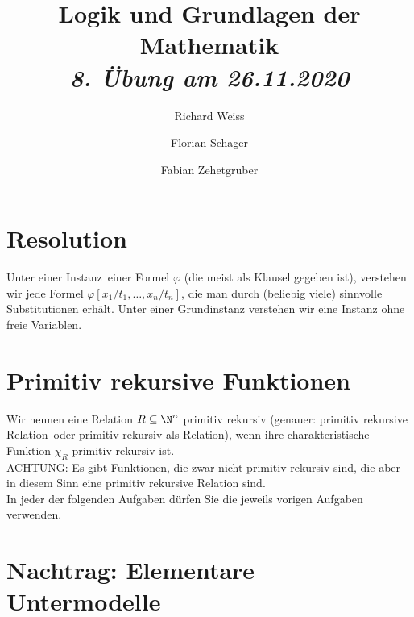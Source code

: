\documentclass{article}
\title
{
  Logik und Grundlagen der Mathematik \\
  \vspace{4pt}
  \normalsize
  \textit{8. Übung am 26.11.2020}
}
\author
{
  Richard Weiss
  \and
  Florian Schager
  \and
  Fabian Zehetgruber
}
\date{}
\begin{document}
\maketitle

\section*{Resolution}
Unter einer \glqq Instanz\grqq\ einer Formel $\varphi$ (die meist als Klausel gegeben ist),
verstehen wir jede Formel $\varphi[x_1/t_1,\dots,x_n/t_n]$, die man durch (beliebig viele)
sinnvolle Substitutionen erhält. Unter einer Grundinstanz verstehen wir eine Instanz
ohne freie Variablen.




\section*{Primitiv rekursive Funktionen}
Wir nennen eine Relation $R \subseteq \N^n$ primitiv rekursiv (genauer: \glqq
primitiv rekursive Relation\grqq\, oder \glqq primitiv rekursiv als Relation\grqq), wenn
ihre charakteristische Funktion $\chi_R$ primitiv rekursiv ist. \\
ACHTUNG: Es gibt Funktionen, die zwar nicht primitiv rekursiv sind, die aber
in diesem Sinn eine primitiv rekursive Relation sind. \\
In jeder der folgenden Aufgaben dürfen Sie die jeweils vorigen Aufgaben verwenden.




\section*{Nachtrag: Elementare Untermodelle}



\end{document}
